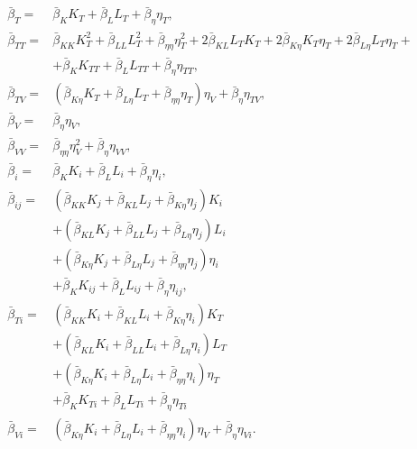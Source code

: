 \documentclass[english]{../thermomemo/thermomemo}
\newcommand*{\lb}{\left(}
\newcommand*{\rb}{\right)}
\begin{document}
\begin{align}
  \label{eq:B_T}
  \bar{\beta}_{T} =& \bar{\beta}_K K_T + \bar{\beta}_L L_T + \bar{\beta}_\eta \eta_T, \\
  \label{eq:B_TT}
  \bar{\beta}_{TT} =& \bar{\beta}_{KK} K_T^2 + \bar{\beta}_{LL} L_T^2
                      + \bar{\beta}_{\eta\eta} \eta_T^2 + 2 \bar{\beta}_{KL} L_TK_T +
                     2\bar{\beta}_{K\eta} K_T\eta_T + 2 \bar{\beta}_{L\eta} L_T \eta_T +
                      \nonumber \\
                     & + \bar{\beta}_K K_{TT} + \bar{\beta}_L L_{TT} + \bar{\beta}_\eta \eta_{TT}, \\
  \label{eq:B_TV}
  \bar{\beta}_{TV} =& \lb \bar{\beta}_{K\eta} K_T + \bar{\beta}_{L\eta} L_T + \bar{\beta}_{\eta\eta} \eta_{T}\rb\eta_{V} + \bar{\beta}_{\eta} \eta_{TV}, \\
  \label{eq:B_V}
  \bar{\beta}_{V} =& \bar{\beta}_\eta \eta_V, \\
  \label{eq:B_VV}
  \bar{\beta}_{VV} =& \bar{\beta}_{\eta\eta} \eta_V^2 + \bar{\beta}_\eta \eta_{VV}, \\
  \label{eq:B_n}
  \bar{\beta}_{i} =& \bar{\beta}_K K_i + \bar{\beta}_L L_i + \bar{\beta}_\eta \eta_i, \\
  \label{eq:B_nn}
  \bar{\beta}_{ij} =& \lb \bar{\beta}_{KK} K_j + \bar{\beta}_{KL} L_j + \bar{\beta}_{K\eta}\eta_j  \rb K_i \nonumber \\& + \lb \bar{\beta}_{KL} K_j + \bar{\beta}_{LL} L_j + \bar{\beta}_{L\eta}\eta_j \rb L_i \nonumber \\& + \lb \bar{\beta}_{K\eta}K_j + \bar{\beta}_{L\eta}L_j + \bar{\beta}_{\eta\eta} \eta_j \rb\eta_i \nonumber \\ &+ \bar{\beta}_K K_{ij} + \bar{\beta}_L L_{ij} + \bar{\beta}_\eta \eta_{ij}, \\
  \label{eq:B_Tn}
  \bar{\beta}_{Ti} =& \lb \bar{\beta}_{KK} K_i + \bar{\beta}_{KL} L_i + \bar{\beta}_{K\eta}\eta_i  \rb K_T \nonumber \\& + \lb \bar{\beta}_{KL} K_i + \bar{\beta}_{LL} L_i + \bar{\beta}_{L\eta}\eta_i \rb L_T \nonumber \\& + \lb \bar{\beta}_{K\eta}K_i + \bar{\beta}_{L\eta}L_i + \bar{\beta}_{\eta\eta} \eta_i \rb\eta_T \nonumber \\ &+ \bar{\beta}_K K_{Ti} + \bar{\beta}_L L_{Ti} + \bar{\beta}_\eta \eta_{Ti} \\
  \label{eq:B_Vn}
  \bar{\beta}_{Vi} =& \lb \bar{\beta}_{K\eta}K_i + \bar{\beta}_{L\eta}L_i + \bar{\beta}_{\eta\eta}\eta_i \rb \eta_V + \bar{\beta}_\eta \eta_{Vi}.
\end{align}
\end{document}
